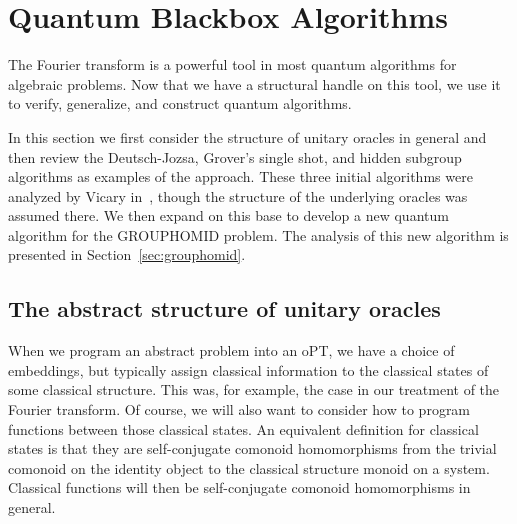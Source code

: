 \section{Quantum Blackbox Algorithms}
\label{sec:blackbox}
The Fourier transform is a powerful tool in most quantum algorithms for algebraic problems. Now that we have a structural handle on this tool, we use it to verify, generalize, and construct quantum algorithms.

In this section we first consider the structure of unitary oracles in general and then review the Deutsch-Jozsa, Grover's single shot, and hidden subgroup algorithms as examples of the approach.  These three initial algorithms were analyzed by Vicary in~\cite{vicary-tqa}, though the structure of the underlying oracles was assumed there.  We then expand on this base to develop a new quantum algorithm for the GROUPHOMID problem. The analysis of this new algorithm is presented in Section~\ref{sec:grouphomid}.

\subsection{The abstract structure of unitary oracles}
\label{sec:unitaryoracles}

When we program an abstract problem into an oPT, we have a choice of embeddings, but typically assign classical information to the classical states of some classical structure. This was, for example, the case in our treatment of the Fourier transform. Of course, we will also want to consider how to program functions between those classical states. An equivalent definition for classical states is that they are self-conjugate comonoid homomorphisms from the trivial comonoid on the identity object to the classical structure monoid on a system. Classical functions will then be self-conjugate comonoid homomorphisms in general.

